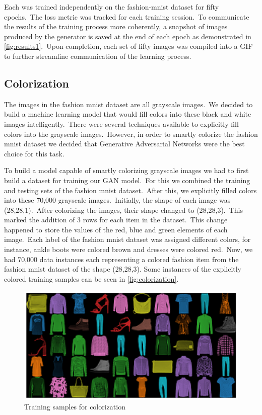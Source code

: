\documentclass[conference]{IEEEtran}
\begin{document}
    Each was trained independently on the fashion-mnist dataset for fifty epochs.\ The loss metric was tracked for each training session.\ To communicate the results of the training process more coherently, a snapshot of images produced by the generator is saved at the end of each epoch as demonstrated in \autoref{fig:results1}.\ Upon completion, each set of fifty images was compiled into a GIF to further streamline communication of the learning process.

    \subsection{Colorization}\label{subsec:implementation-colorization}

    The images in the fashion mnist dataset are all grayscale images.\ We decided to build a machine learning model that would fill colors into these black and white images intelligently.\ There were several techniques available to explicitly fill colors into the grayscale images.\ However, in order to smartly colorize the fashion mnist dataset we decided that Generative Adversarial Networks were the best choice for this task.

    To build a model capable of smartly colorizing grayscale images we had to first build a dataset for training our GAN model.\ For this we combined the training and testing sets of the fashion mnist dataset.\ After this, we explicitly filled colors into these 70,000 grayscale images.\ Initially, the shape of each image was (28,28,1).\ After colorizing the images, their shape changed to (28,28,3).\ This marked the addition of 3 rows for each item in the dataset.\ This change happened to store the values of the red, blue and green elements of each image.\ Each label of the fashion mnist dataset was assigned different colors, for instance, ankle boots were colored brown and dresses were colored red.\ Now, we had 70,000 data instances each representing a colored fashion item from the fashion mnist dataset of the shape (28,28,3). Some instances of the explicitly colored training samples can be seen in \autoref{fig:colorization}.

    \begin{figure}
        \caption{Training samples for colorization}
        \label{fig:colorization}
        \centering
        \includegraphics[scale = 0.33]{Colorization_training_samples.png}
    \end{figure}
\end{document}
